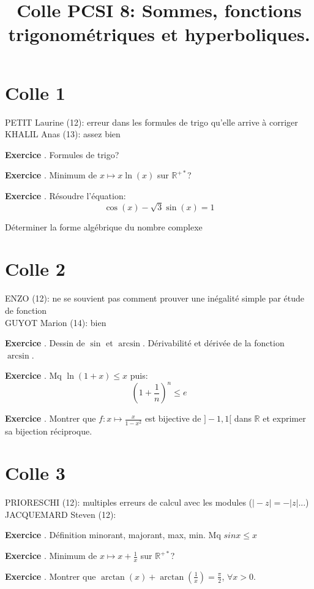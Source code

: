 \documentclass[10pt,a4paper]{article}
\title{Colle PCSI 8: Sommes, fonctions trigonométriques et hyperboliques.}
\newcounter{question}
\newcounter{exo}
\newenvironment{exo}{\vspace{0.5cm}\setcounter{question}{0}\addtocounter{exo}{1} \noindent \textbf{Exercice \theexo}. \normalsize }{\par}
\begin{document}
	\maketitle
	
	
	\section*{Colle 1}
	\setcounter{exo}{0}
	PETIT Laurine (12): erreur dans les formules de trigo qu'elle arrive à corriger\\
	KHALIL Anas (13): assez bien\\
			
	\begin{exo}
		Formules de trigo?
	\end{exo}

	\begin{exo}
		Minimum de $x \longmapsto x \ln(x)$ sur $\mathbb{R}^{+*}$?
	\end{exo}

	\begin{exo}
		Résoudre l'équation:
		$$\cos(x) - \sqrt{3} \sin(x) = 1$$
	\end{exo}

	Déterminer la forme algébrique du nombre complexe
	
	\section*{Colle 2}
	\setcounter{exo}{0}
	ENZO (12): ne se souvient pas comment prouver une inégalité simple par étude de fonction\\
	GUYOT Marion (14): bien\\
	
	\begin{exo}
	    Dessin de $\sin$ et $\arcsin$. Dérivabilité et dérivée de la fonction $\arcsin$. 
	\end{exo}
	\begin{exo}
		Mq $\ln(1+x) \leq x$ puis: $$(1 + \frac{1}{n})^n \leq e$$
	\end{exo}
		
	\begin{exo}
		Montrer que $f: x \longmapsto \frac{x}{1-x^2}$ est bijective de $]-1, 1[$ dans $\mathbb{R}$ et exprimer sa bijection réciproque.
	\end{exo}	
			
	\section*{Colle 3}
	\setcounter{exo}{0}
	PRIORESCHI (12): multiples erreurs de calcul avec les modules ($\vert -z \vert = - \vert z \vert$...)\\
	JACQUEMARD Steven (12):\\
	
	\begin{exo}
		Définition minorant, majorant, max, min. Mq $sin x \leq x$ 
	\end{exo}

	\begin{exo}
		Minimum de $x \longmapsto x + \frac{1}{x}$ sur $\mathbb{R}^{+*}$?
	\end{exo}
	
	\begin{exo}
		Montrer que $\arctan(x) + \arctan(\frac{1}{x}) = \frac{\pi}{2}$, $\forall x > 0$.
	\end{exo}
	
\end{document}
